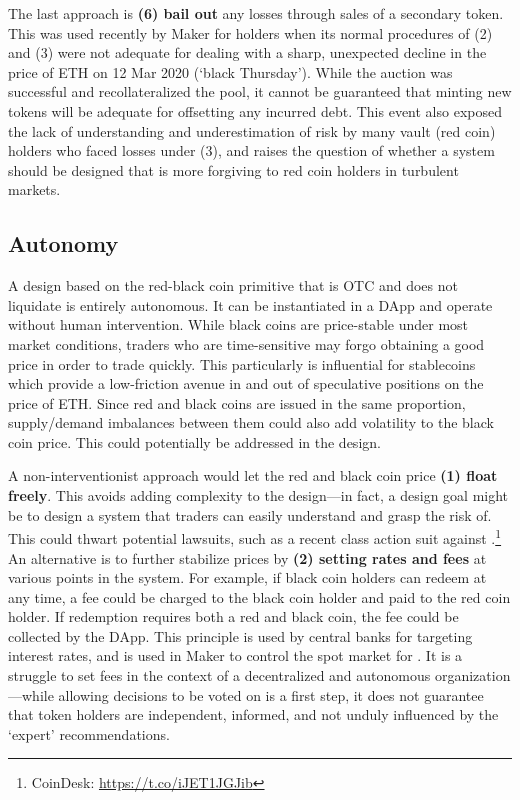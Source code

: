 The last approach is \textbf{(6) bail out} any losses through sales of a secondary token. This was used recently by Maker for \dai holders when its normal procedures of (2) and (3) were not adequate for dealing with a sharp, unexpected decline in the price of ETH on 12 Mar 2020 (`black Thursday'). While the auction was successful and recollateralized the pool, it cannot be guaranteed that minting new tokens will be adequate for offsetting any incurred debt. This event also exposed the lack of understanding and underestimation of risk by many vault (\ie red coin) holders who faced losses under (3), and raises the question of whether a system should be designed that is more forgiving to red coin holders in turbulent markets.%


\subsection{Autonomy} 

A design based on the red-black coin primitive that is OTC and does not liquidate is entirely autonomous. It can be instantiated in a DApp and operate without human intervention. While black coins are price-stable under most market conditions, traders who are time-sensitive may forgo obtaining a good price in order to trade quickly. This particularly is influential for stablecoins which provide a low-friction avenue in and out of speculative positions on the price of ETH. Since red and black coins are issued in the same proportion, supply/demand imbalances between them could also add volatility to the black coin price. This could potentially be addressed in the design. 

A non-interventionist approach would let the red and black coin price \textbf{(1) float freely}. This avoids adding complexity to the design---in fact, a design goal might be to design a system that traders can easily understand and grasp the risk of. This could thwart potential lawsuits, such as a recent class action suit against \dai.\footnote{CoinDesk: \url{https://t.co/iJET1JGJib}} An alternative is to further stabilize prices by \textbf{(2) setting rates and fees} at various points in the system. For example, if black coin holders can redeem at any time, a fee could be charged to the black coin holder and paid to the red coin holder. If redemption requires both a red and black coin, the fee could be collected by the DApp. This principle is used by central banks for targeting interest rates, and is used in Maker to control the spot market for \dai. It is a struggle to set fees in the context of a decentralized and autonomous organization---while allowing decisions to be voted on is a first step, it does not guarantee that token holders are independent, informed, and not unduly influenced by the `expert' recommendations. 


